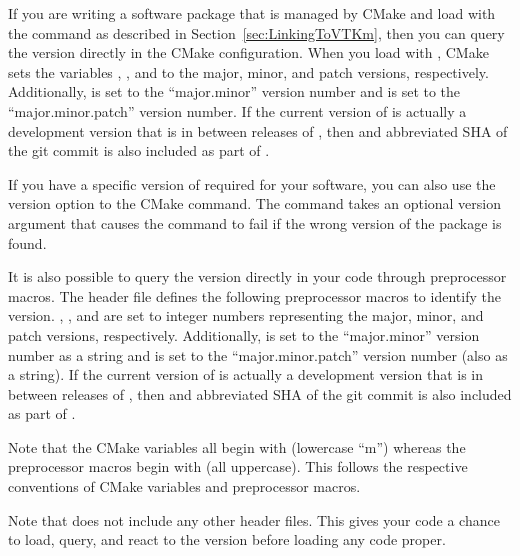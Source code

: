 
If you are writing a software package that is managed by CMake and load \VTKm with the  command as described in Section~\ref{sec:LinkingToVTKm}, then you can query the \VTKm version directly in the CMake configuration.
When you load \VTKm with , CMake sets the variables , , and  to the major, minor, and patch versions, respectively.
Additionally,  is set to the ``major.minor'' version number and  is set to the ``major.minor.patch'' version number.
If the current version of \VTKm is actually a development version that is in between releases of \VTKm, then and abbreviated SHA of the git commit is also included as part of .

\begin{didyouknow}
  If you have a specific version of \VTKm required for your software, you can also use the version option to the  CMake command.
  The  command takes an optional version argument that causes the command to fail if the wrong version of the package is found.
\end{didyouknow}



It is also possible to query the \VTKm version directly in your code through preprocessor macros.
The  header file defines the following preprocessor macros to identify the \VTKm version.
, , and  are set to integer numbers representing the major, minor, and patch versions, respectively.
Additionally,  is set to the ``major.minor'' version number as a string and  is set to the ``major.minor.patch'' version number (also as a string).
If the current version of \VTKm is actually a development version that is in between releases of \VTKm, then and abbreviated SHA of the git commit is also included as part of .

\begin{commonerrors}
  Note that the CMake variables all begin with  (lowercase ``m'') whereas the preprocessor macros begin with  (all uppercase).
  This follows the respective conventions of CMake variables and preprocessor macros.
\end{commonerrors}

Note that  does not include any other \VTKm header files.
This gives your code a chance to load, query, and react to the \VTKm version before loading any \VTKm code proper.


